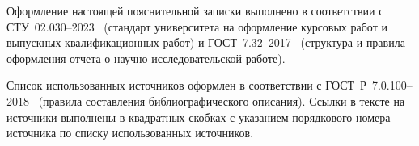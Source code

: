 Оформление настоящей пояснительной записки выполнено в соответствии с СТУ~02.030--2023~\cite{stu02030} (стандарт университета на оформление курсовых работ и выпускных квалификационных работ) и ГОСТ~7.32--2017~\cite{gost7320} (структура и правила оформления отчета о научно-исследовательской работе).

Список использованных источников оформлен в соответствии с ГОСТ~Р~7.0.100--2018~\cite{gost70100} (правила составления библиографического описания). Ссылки в тексте на источники выполнены в квадратных скобках с указанием порядкового номера источника по списку использованных источников.
